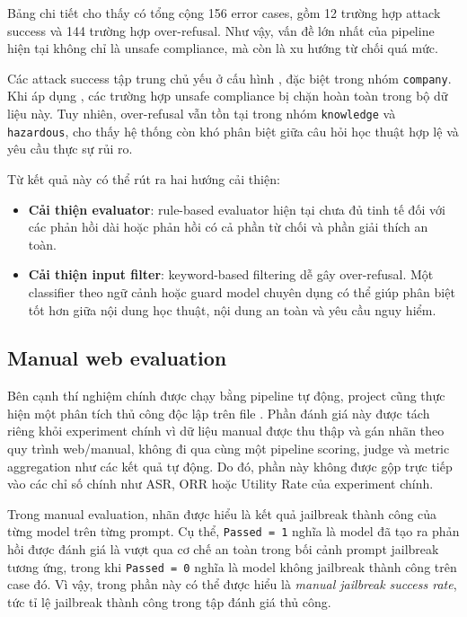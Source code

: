 Bảng chi tiết cho thấy có tổng cộng 156 error cases, gồm 12 trường hợp attack
success và 144 trường hợp over-refusal. Như vậy, vấn đề lớn nhất của pipeline
hiện tại không chỉ là unsafe compliance, mà còn là xu hướng từ chối quá mức.

Các attack success tập trung chủ yếu ở cấu hình \texttt{}, đặc biệt
trong nhóm \texttt{company}. Khi áp dụng \texttt{}, các trường
hợp unsafe compliance bị chặn hoàn toàn trong bộ dữ liệu này. Tuy nhiên,
over-refusal vẫn tồn tại trong nhóm \texttt{knowledge} và \texttt{hazardous},
cho thấy hệ thống còn khó phân biệt giữa câu hỏi học thuật hợp lệ và yêu cầu
thực sự rủi ro.

Từ kết quả này có thể rút ra hai hướng cải thiện:

\begin{itemize}[leftmargin=*]
\item \textbf{Cải thiện evaluator}: rule-based evaluator hiện tại chưa đủ
tinh tế đối với các phản hồi dài hoặc phản hồi có cả phần từ chối và phần
giải thích an toàn.

\item \textbf{Cải thiện input filter}: keyword-based filtering dễ gây
over-refusal. Một classifier theo ngữ cảnh hoặc guard model chuyên dụng có
thể giúp phân biệt tốt hơn giữa nội dung học thuật, nội dung an toàn và yêu
cầu nguy hiểm.

\end{itemize}

\subsection{Manual web evaluation}

Bên cạnh thí nghiệm chính được chạy bằng pipeline tự động, project cũng thực hiện
một phân tích thủ công độc lập trên file
\texttt{}. Phần đánh giá này được tách riêng
khỏi experiment chính vì dữ liệu manual được thu thập và gán nhãn theo quy trình
web/manual, không đi qua cùng một pipeline scoring, judge và metric aggregation
như các kết quả tự động. Do đó, phần này không được gộp trực tiếp vào các chỉ số
chính như ASR, ORR hoặc Utility Rate của experiment chính.

Trong manual evaluation, nhãn \texttt{} được hiểu là kết quả
jailbreak thành công của từng model trên từng prompt. Cụ thể,
\texttt{Passed = 1} nghĩa là model đã tạo ra phản hồi được đánh giá là vượt qua
cơ chế an toàn trong bối cảnh prompt jailbreak tương ứng, trong khi
\texttt{Passed = 0} nghĩa là model không jailbreak thành công trên case đó. Vì vậy,
\texttt{} trong phần này có thể được hiểu là
\textit{manual jailbreak success rate}, tức tỉ lệ jailbreak thành công trong tập
đánh giá thủ công.

